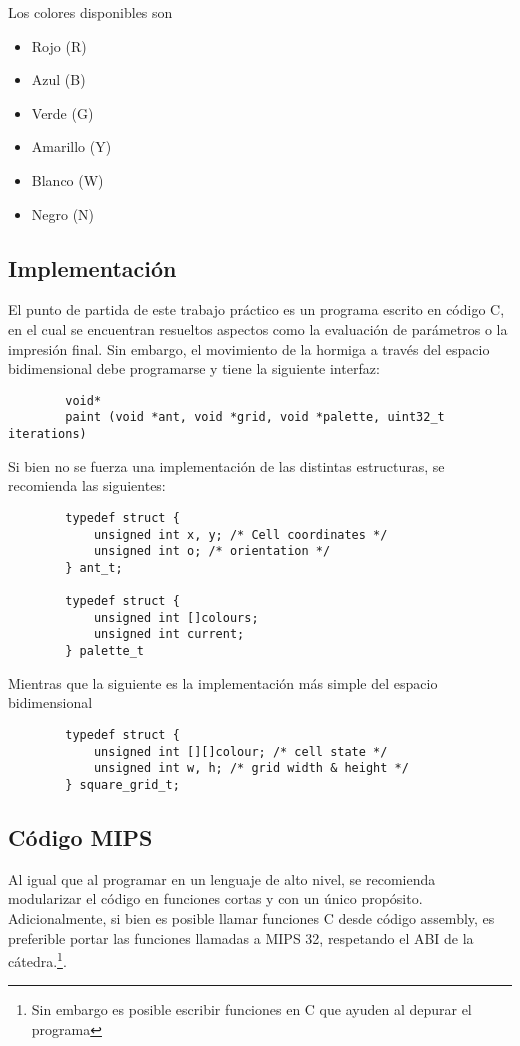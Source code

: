 \documentclass{article}
\begin{document}
Los colores disponibles son
\begin{itemize}
\item Rojo (R)
\item Azul (B)
\item Verde (G)
\item Amarillo (Y)
\item Blanco (W)
\item Negro (N)
\end{itemize}

\subsection{Implementación}
El punto de partida de este trabajo práctico es un programa escrito en código C, en el cual se encuentran resueltos
aspectos como la evaluación de parámetros o la impresión final. Sin embargo, el movimiento de la hormiga a través del
espacio bidimensional debe programarse y tiene la siguiente interfaz:

\begin{verbatim}
        void*
        paint (void *ant, void *grid, void *palette, uint32_t iterations)
\end{verbatim}

Si bien no se fuerza una implementación de las distintas estructuras, se recomienda las siguientes:

\begin{verbatim}
        typedef struct {
            unsigned int x, y; /* Cell coordinates */
            unsigned int o; /* orientation */
        } ant_t;

        typedef struct {
            unsigned int []colours;
            unsigned int current;
        } palette_t
\end{verbatim}

Mientras que la siguiente es la implementación más simple del espacio bidimensional
\begin{verbatim}
        typedef struct {
            unsigned int [][]colour; /* cell state */
            unsigned int w, h; /* grid width & height */
        } square_grid_t;
\end{verbatim}

\subsection{Código MIPS}
Al igual que al programar en un lenguaje de alto nivel, se recomienda modularizar el código en funciones
cortas y con un único propósito. Adicionalmente, si bien es posible llamar funciones C desde código assembly,
es preferible portar las funciones llamadas a MIPS 32, respetando el ABI de la cátedra.\footnote{Sin embargo es posible escribir funciones en C que ayuden
al depurar el programa}.
\end{document}

